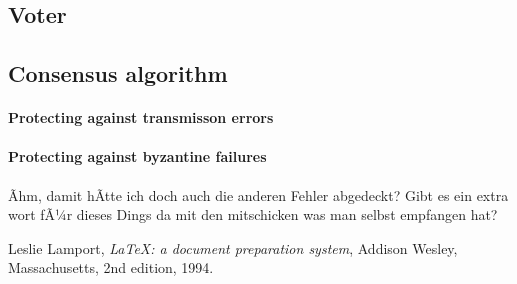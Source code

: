 \documentclass[
    12pt,
    bibliography=totoc,
]{scrartcl}
\begin{document}
\subsection{Voter}
\subsection{Consensus algorithm}
\paragraph{Protecting against transmisson errors}
\paragraph{Protecting against byzantine failures}
Ãhm, damit hÃtte ich doch auch die anderen Fehler abgedeckt?
Gibt es ein extra wort fÃ¼r dieses Dings da mit den mitschicken was man selbst empfangen hat?

\clearpage
\begin{thebibliography}{9}

  Leslie Lamport,
  \emph{\LaTeX: a document preparation system},
  Addison Wesley, Massachusetts,
  2nd edition,
  1994.
  
\end{thebibliography}
\end{document}
